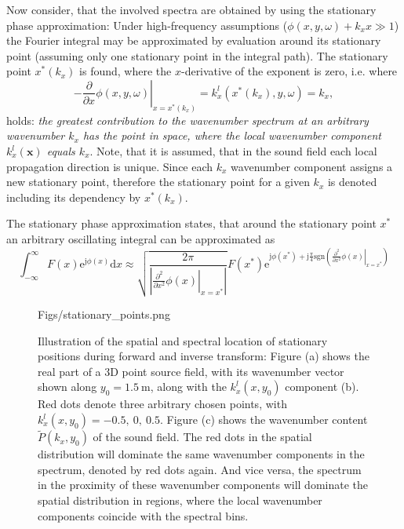 \documentclass[12pt,a4paper]{article}
\newcommand{\td}{\mathrm{d}}
\newcommand{\te}{\mathrm{e}}
\newcommand{\ti}{\mathrm{j}}
\newcommand{\vx}{\mathbf{x}}
\begin{document}
Now consider, that the involved spectra are obtained by using the stationary phase approximation:
Under high-frequency assumptions ($\phi(x,y,\omega)+k_x x \gg 1$) the Fourier integral may be approximated by evaluation around its stationary point (assuming only one stationary point in the integral path). The stationary point $x^*(k_x)$ is found, where the $x$-derivative of the exponent is zero, i.e. where
\begin{equation}
- \left. \frac{\partial}{\partial x} \phi(x,y,\omega) \right|_{x = x^*(k_x)} = k_x^l(x^*(k_x),y,\omega) = k_x,
\end{equation}
holds: \emph{the greatest contribution to the wavenumber spectrum at an arbitrary wavenumber $k_x$ has the point in space, where the local wavenumber component $k_x^l(\vx)$ equals $k_x$}. Note, that it is assumed, that in the sound field each local propagation direction is unique.
Since each $k_x$ wavenumber component assigns a new stationary point, therefore the stationary point for a given $k_x$ is denoted including its dependency by $x^*(k_x)$.

The stationary phase approximation states, that around the stationary point $x^*$ an arbitrary oscillating integral can be approximated as 
\begin{equation}
\int_{-\infty}^{\infty} F(x)\te^{\ti \phi(x)} \td x \approx \sqrt{\frac{2\pi}{| \left. \frac{\partial^2}{\partial x^2} \phi(x)\right|_{x = x^*}|  }}
F(x^*) \te^{\ti \phi(x^*) + 
\ti \frac{\pi}{4} \text{sgn}\left( \left. \frac{\partial^2}{\partial x^2} \phi(x)\right|_{x = x^*} \right)}
\end{equation}

\begin{figure}
	\centering
	\begin{overpic}[width = 1\columnwidth]{Figs/stationary_points.png}
	\scriptsize
	\end{overpic}
	\caption{Illustration of the spatial and spectral location of stationary positions during forward and inverse transform: Figure (a) shows the real part of a 3D point source field, with its wavenumber vector shown along $y_0 = 1.5~\mathrm{m}$, along with the $k^l_x(x,y_0)$ component (b). Red dots denote three arbitrary chosen points, with $k^l_x(x,y_0) = -0.5,\ 0,\ 0.5$. Figure (c) shows the wavenumber content $\tilde{P}(k_x,y_0)$ of the sound field. The red dots in the spatial distribution will dominate the same wavenumber components in the spectrum, denoted by red dots again. And vice versa, the spectrum in the proximity of these wavenumber components will dominate the spatial distribution in regions, where the local wavenumber components coincide with the spectral bins.}
	\label{fig:stationary_positions}
\end{figure}
\end{document}
